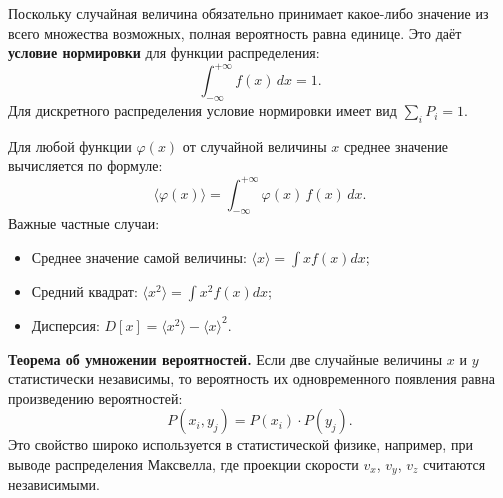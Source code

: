 \begin{theorem}
Поскольку случайная величина обязательно принимает какое-либо значение из всего множества возможных, полная вероятность равна единице. Это даёт \textbf{условие нормировки} для функции распределения:
\begin{equation}
    \int_{-\infty}^{+\infty} f(x) \, dx = 1. \label{eq:normalization_51}
\end{equation}
Для дискретного распределения условие нормировки имеет вид $\sum_i P_i = 1$.
\end{theorem}

\begin{property}
Для любой функции $\varphi(x)$ от случайной величины $x$ среднее значение вычисляется по формуле:
\begin{equation}
    \langle \varphi(x) \rangle = \int_{-\infty}^{+\infty} \varphi(x) \, f(x) \, dx. \label{eq:mean_general_51}
\end{equation}
Важные частные случаи:
\begin{itemize}
    \item Среднее значение самой величины: $\langle x \rangle = \int x f(x) dx$;
    \item Средний квадрат: $\langle x^2 \rangle = \int x^2 f(x) dx$;
    \item Дисперсия: $D[x] = \langle x^2 \rangle - \langle x \rangle^2$.
\end{itemize}
\end{property}

\begin{remark}
\textbf{Теорема об умножении вероятностей.} Если две случайные величины $x$ и $y$ статистически независимы, то вероятность их одновременного появления равна произведению вероятностей:
\begin{equation}
    P(x_i, y_j) = P(x_i) \cdot P(y_j). \label{eq:independence_51}
\end{equation}
Это свойство широко используется в статистической физике, например, при выводе распределения Максвелла, где проекции скорости $v_x$, $v_y$, $v_z$ считаются независимыми.
\end{remark}
